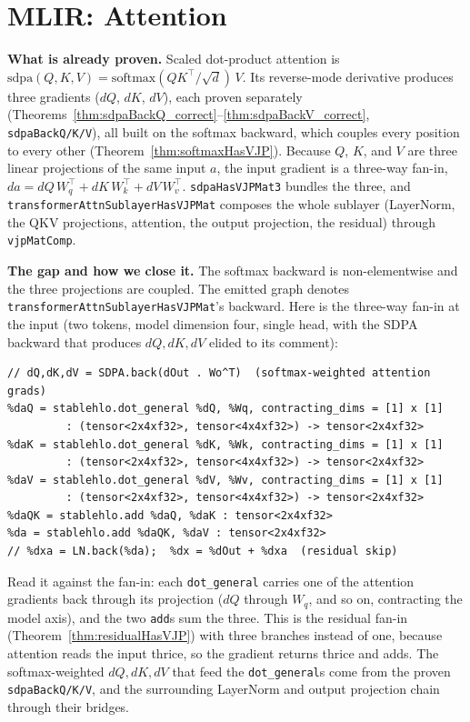 \section{MLIR: Attention}

\noindent\textbf{What is already proven.} Scaled dot-product
attention is $\mathrm{sdpa}(Q,K,V) = \mathrm{softmax}(QK^{\!\top}/\sqrt{d})\,V$.
Its reverse-mode derivative produces three gradients ($dQ$, $dK$, $dV$),
each proven separately
(Theorems~\ref{thm:sdpaBackQ_correct}--\ref{thm:sdpaBackV_correct},
\texttt{sdpaBackQ/K/V}), all built on the softmax backward, which
couples every position to every other (Theorem~\ref{thm:softmaxHasVJP}). Because $Q$, $K$, and $V$ are three linear
projections of the same input $a$, the input gradient is a three-way
fan-in, $da = dQ\,W_q^{\!\top} + dK\,W_k^{\!\top} + dV\,W_v^{\!\top}$.
\texttt{sdpaHasVJPMat3} bundles the three, and
\texttt{transformerAttnSublayerHasVJPMat} composes the whole sublayer
(LayerNorm, the QKV projections, attention, the output projection, the
residual) through \texttt{vjpMatComp}.

\medskip\noindent\textbf{The gap and how we close it.} The softmax backward
is non-elementwise and the three projections are coupled. The emitted graph
denotes \texttt{transformerAttnSublayerHasVJPMat}'s backward. Here is
the three-way fan-in at the input (two tokens, model dimension four, single
head, with the SDPA backward that produces $dQ,dK,dV$ elided to its comment):

\begin{verbatim}
// dQ,dK,dV = SDPA.back(dOut . Wo^T)  (softmax-weighted attention grads)
%daQ = stablehlo.dot_general %dQ, %Wq, contracting_dims = [1] x [1]
         : (tensor<2x4xf32>, tensor<4x4xf32>) -> tensor<2x4xf32>
%daK = stablehlo.dot_general %dK, %Wk, contracting_dims = [1] x [1]
         : (tensor<2x4xf32>, tensor<4x4xf32>) -> tensor<2x4xf32>
%daV = stablehlo.dot_general %dV, %Wv, contracting_dims = [1] x [1]
         : (tensor<2x4xf32>, tensor<4x4xf32>) -> tensor<2x4xf32>
%daQK = stablehlo.add %daQ, %daK : tensor<2x4xf32>
%da = stablehlo.add %daQK, %daV : tensor<2x4xf32>
// %dxa = LN.back(%da);  %dx = %dOut + %dxa  (residual skip)
\end{verbatim}

\noindent Read it against the fan-in: each \texttt{dot\_general} carries one
of the attention gradients back through its projection ($dQ$ through $W_q$,
and so on, contracting the model axis), and the two \texttt{add}s sum the
three. This is the residual fan-in (Theorem~\ref{thm:residualHasVJP}) with three
branches instead of one, because attention reads the input thrice, so the
gradient returns thrice and adds. The softmax-weighted $dQ,dK,dV$ that feed the
\texttt{dot\_general}s come from the proven \texttt{sdpaBackQ/K/V}, and
the surrounding LayerNorm and output projection chain through their bridges.

